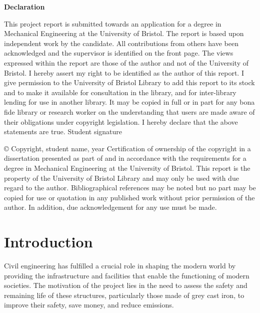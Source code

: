 \documentclass[11pt,a4paper]{article}
\begin{document}
\begin{center}
\textbf{\fontsize{16}{\baselineskip}\selectfont Declaration}

\bigskip

This project report is submitted towards an application for a degree in Mechanical Engineering at the University of Bristol. The report is based upon independent work by the candidate. All contributions from others have been acknowledged and the supervisor is identified on the front page. The views expressed within the report are those of the author and not of the University of Bristol.
I hereby assert my right to be identified as the author of this report. I give permission to the University of Bristol Library to add this report to its stock and to make it available for consultation in the library, and for inter-library lending for use in another library. It may be copied in full or in part for any bona fide library or research worker on the understanding that users are made aware of their obligations under copyright legislation.
I hereby declare that the above statements are true.
{Student signature}
\bigskip
\bigskip
\bigskip
\bigskip
\bigskip
\bigskip
\bigskip
\bigskip
\bigskip
\bigskip
\bigskip


© Copyright, {student name, year}
Certification of ownership of the copyright in a dissertation presented as part of and in accordance with the requirements for a degree in Mechanical Engineering at the University of Bristol.
This report is the property of the University of Bristol Library and may only be used with due regard to the author. Bibliographical references may be noted but no part may be copied for use or quotation in any published work without prior permission of the author. In addition, due acknowledgement for any use must be made.
\end{center}
\bigskip
\bigskip
\bigskip
\bigskip
\bigskip
\bigskip
\bigskip
\bigskip
\bigskip
\bigskip
\bigskip
\bigskip
\bigskip
\bigskip
\bigskip
\bigskip
\bigskip
\bigskip
\bigskip
\bigskip
\bigskip
\bigskip
\bigskip
\bigskip
\bigskip
\bigskip
\bigskip
\bigskip
\bigskip
\bigskip
\bigskip
\bigskip
\bigskip

\tableofcontents


\bigskip
\bigskip
\bigskip
\bigskip
\bigskip
\bigskip
\bigskip


\section{Introduction}

Civil engineering has fulfilled a crucial role in shaping the modern world by providing the infrastructure and facilities that enable the functioning of modern societies. The motivation of the project lies in the need to assess the safety and remaining life of these structures, particularly those made of grey cast iron, to improve their safety, save money, and reduce emissions.
\end{document}

